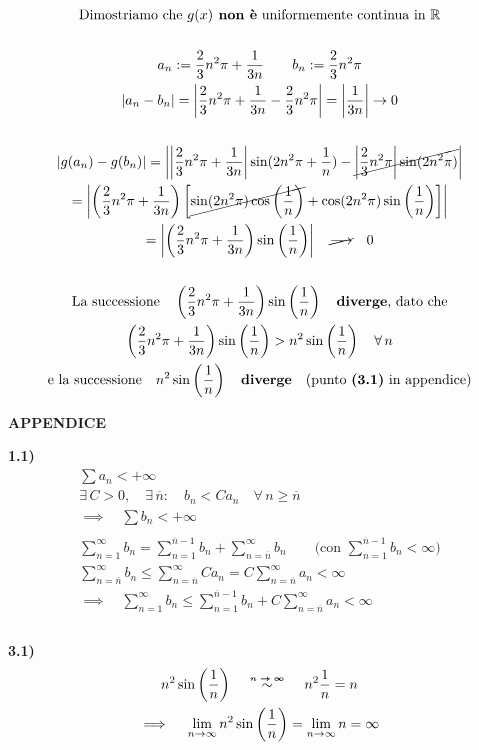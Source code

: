 \documentclass[11pt,reqno]{amsart}
\begin{document}
\begin{gather*}
  \text{Dimostriamo che } g(x) \textbf{ non è} \text{ uniformemente continua in } \mathbb{R}\\\\
  a_n := \frac{2}{3}n^2\pi + \frac{1}{3n} \quad \quad b_n := \frac{2}{3}n^2\pi\\
  |a_n - b_n| = \left|\frac{2}{3}n^2\pi + \frac{1}{3n} - \frac{2}{3}n^2\pi\right| = \left|\frac{1}{3n}\right| \to 0\\\\
  |g(a_n) - g(b_n)| = \left|\left|\frac{2}{3}n^2\pi + \frac{1}{3n}\right|\sin(2n^2\pi + \frac{1}{n}) - \cancel{\left|\frac{2}{3}n^2\pi\right|\sin(2n^2\pi)}\right|\\
  = \left|\left(\frac{2}{3}n^2\pi + \frac{1}{3n}\right)\left[\cancel{\sin(2n^2\pi)\cos\left(\frac{1}{n}\right)}+\cos(2n^2\pi)\sin\left(\frac{1}{n}\right)\right]\right|\\
  = \left|\left(\frac{2}{3}n^2\pi + \frac{1}{3n}\right)\sin\left(\frac{1}{n}\right)\right| \quad \cancel{\longrightarrow} \quad 0\\\\
  \text{La successione} \quad \left(\frac{2}{3}n^2\pi + \frac{1}{3n}\right)\sin\left(\frac{1}{n}\right) \quad \textbf{diverge} \text{, dato che}\\
  \left(\frac{2}{3}n^2\pi + \frac{1}{3n}\right)\sin\left(\frac{1}{n}\right) > n^2\sin\left(\frac{1}{n}\right) \quad \forall \, n\\
  \text{e la successione} \quad n^2\sin\left(\frac{1}{n}\right) \quad \textbf{diverge} \quad \text{(punto } \textbf{(3.1)} \text{ in appendice)}
\end{gather*}

\newpage

\centerline{\bf APPENDICE }

{\bf 1.1)}
\begin{gather*}
  \sum a_n < +\infty\\
  \exists \, C > 0, \quad \exists \, \overline{n}: \quad b_n < Ca_n \quad \forall \, n \geq \overline{n}\\
  \implies \quad \sum b_n < +\infty\\\\
  \sum_{n = 1}^{\infty} b_n = \sum_{n = 1}^{\overline{n} - 1} b_n + \sum_{n = \overline{n}}^{\infty} b_n \quad \quad \text{(con } \sum_{n = 1}^{\overline{n} - 1} b_n < \infty \text{)}\\
  \sum_{n = \overline{n}}^{\infty} b_n \leq \sum_{n = \overline{n}}^{\infty} Ca_n = C\sum_{n = \overline{n}}^{\infty} a_n < \infty\\
  \implies \quad \sum_{n = 1}^{\infty} b_n \leq \sum_{n = 1}^{\overline{n} - 1} b_n + C\sum_{n = \overline{n}}^{\infty} a_n < \infty\\\\
\end{gather*}

{\bf 3.1)}
\begin{gather*}
  n^2 \sin\left(\frac{1}{n}\right) \quad \quad \stackrel{\mathclap{\tiny\mbox{\boldmath$n \to \infty$}}}{\sim} \quad \quad n^2\frac{1}{n} = n\\
  \implies \quad \lim_{n \to \infty} n^2 \sin\left(\frac{1}{n}\right) = \lim_{n \to \infty} n = \infty
\end{gather*}
\end{document}
